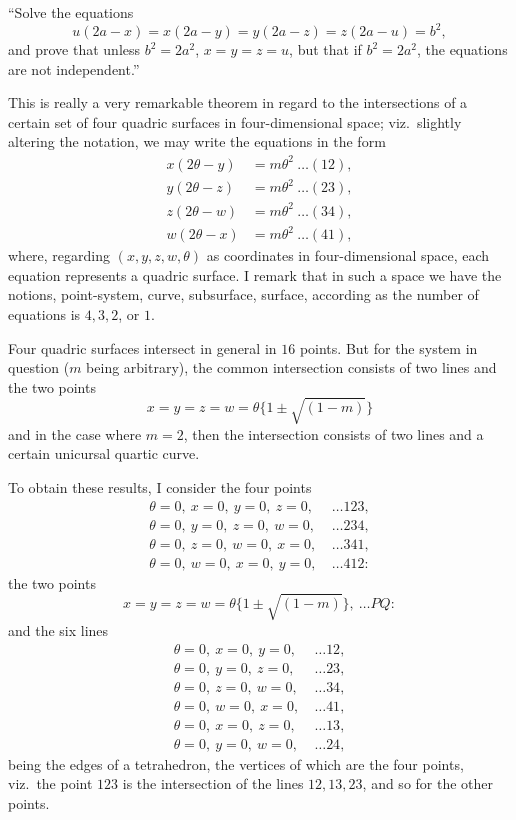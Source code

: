 \documentclass[11pt]{article}
\begin{document}
\smallskip
``Solve the equations
\[
u(2a-x)=x(2a-y)=y(2a-z)=z(2a-u)=b^{2},
\]
and prove that unless $b^{2}=2a^{2}$, $x=y=z=u$, but that if $b^{2}=2a^{2}$, the equations
are not independent.''

\medskip
This is really a very remarkable theorem in regard to the intersections of a certain
set of four quadric surfaces in four-dimensional space; viz.\ slightly altering the
notation, we may write the equations in the form
\begin{align*}
x(2\theta-y) &= m\theta^{2}\ \ldots(12),\\
y(2\theta-z) &= m\theta^{2}\ \ldots(23),\\
z(2\theta-w) &= m\theta^{2}\ \ldots(34),\\
w(2\theta-x) &= m\theta^{2}\ \ldots(41),
\end{align*}
where, regarding $(x,y,z,w,\theta)$ as coordinates in four-dimensional space, each
equation represents a quadric surface. I remark that in such a space we have the
notions, point-system, curve, subsurface, surface, according as the number of equations
is $4,3,2$, or $1$.

Four quadric surfaces intersect in general in $16$ points. But for the system in
question ($m$ being arbitrary), the common intersection consists of two lines and the
two points
\[
x=y=z=w=\theta\{1\pm\sqrt{(1-m)}\}
\]
and in the case where $m=2$, then the intersection consists of two lines and a certain
unicursal quartic curve.

To obtain these results, I consider the four points
\begin{align*}
\theta=0,\ x=0,\ y=0,\ z=0, &\ \ldots 123,\\
\theta=0,\ y=0,\ z=0,\ w=0, &\ \ldots 234,\\
\theta=0,\ z=0,\ w=0,\ x=0, &\ \ldots 341,\\
\theta=0,\ w=0,\ x=0,\ y=0, &\ \ldots 412:
\end{align*}
the two points
\[
x=y=z=w=\theta\{1\pm\sqrt{(1-m)}\},\ \ldots PQ:
\]
and the six lines
\begin{align*}
\theta=0,\ x=0,\ y=0, &\ \ldots 12,\\
\theta=0,\ y=0,\ z=0, &\ \ldots 23,\\
\theta=0,\ z=0,\ w=0, &\ \ldots 34,\\
\theta=0,\ w=0,\ x=0, &\ \ldots 41,\\
\theta=0,\ x=0,\ z=0, &\ \ldots 13,\\
\theta=0,\ y=0,\ w=0, &\ \ldots 24,
\end{align*}
being the edges of a tetrahedron, the vertices of which are the four points, viz.\ the
point $123$ is the intersection of the lines $12,13,23$, and so for the other points.
\end{document}

